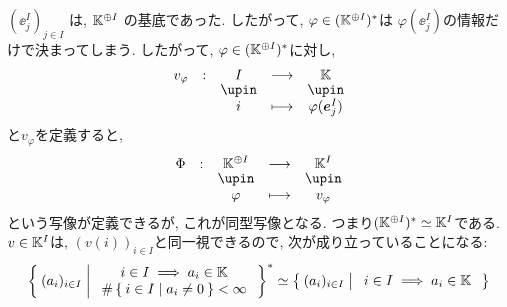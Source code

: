 \begin{remark}
$(\ee^I_{j})_{j\in I}$
は,
$\mathbb{K}^{\oplus I}$
の基底であった.
したがって,
$\varphi\in (\mathbb{K}^{\oplus I})^\ast$は
$\varphi(\ee^I_{j})$の情報だけで決まってしまう.
したがって,
$\varphi\in (\mathbb{K}^{\oplus I})^\ast$に対し,
\begin{align*}
\shazo{v_{\varphi}}{I}{\KK}
{i}{\varphi(\ee^I_{j})}
\end{align*}
と$v_\varphi$を定義すると,
\begin{align*}
\shazo{\Phi}{\KK^{\oplus I}}{\KK^I}
{\varphi}{v_{\varphi}}
\end{align*}
という写像が定義できるが,
これが同型写像となる.
つまり$(\mathbb{K}^{\oplus I})^\ast\simeq \mathbb{K}^I$である.
$v\in \mathbb{K}^I$は,
$(v(i))_{i\in I}$と同一視できるので,
次が成り立っていることになる:
\begin{align*}
\Set{(a_i)_{i\in I}|
\begin{array}{c}
i\in I\implies a_i\in \mathbb{K}\\
\#\Set{i\in I|a_i\neq 0} <\infty
\end{array}
}^\ast
\simeq
\Set{(a_i)_{i\in I}|
\begin{array}{c}
i\in I\implies a_i\in \mathbb{K}\end{array}
}
\end{align*}
\end{remark}


\begin{quiz}
\end{quiz}


\chapter{}
\begin{quiz}
\end{quiz}


